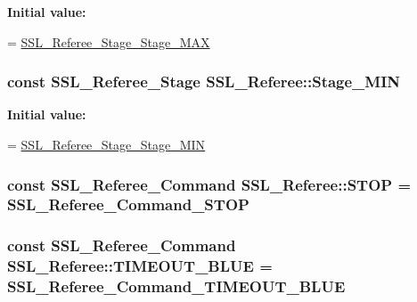 {\bfseries Initial value\-:}
\begin{DoxyCode}
=
    \hyperlink{referee_8pb_8h_a889bcc451ec1e5d5c903210b3ae883fa}{SSL\_Referee\_Stage\_Stage\_MAX}
\end{DoxyCode}
\hypertarget{class_s_s_l___referee_a846b2fccc0f85f19185e811d3552280c}{
\subsubsection[{Stage\-\_\-\-M\-I\-N}]{\setlength{\rightskip}{0pt plus 5cm}const {\bf S\-S\-L\-\_\-\-Referee\-\_\-\-Stage} S\-S\-L\-\_\-\-Referee\-::\-Stage\-\_\-\-M\-I\-N\hspace{0.3cm}{\ttfamily [static]}}}\label{class_s_s_l___referee_a846b2fccc0f85f19185e811d3552280c}
{\bfseries Initial value\-:}
\begin{DoxyCode}
=
    \hyperlink{referee_8pb_8h_aa1dd5e1b73b65e4bd2e0faa6227acd52}{SSL\_Referee\_Stage\_Stage\_MIN}
\end{DoxyCode}
\hypertarget{class_s_s_l___referee_abf541b386a39f54b87622cd8ebafd77f}{
\subsubsection[{S\-T\-O\-P}]{\setlength{\rightskip}{0pt plus 5cm}const {\bf S\-S\-L\-\_\-\-Referee\-\_\-\-Command} S\-S\-L\-\_\-\-Referee\-::\-S\-T\-O\-P = {\bf S\-S\-L\-\_\-\-Referee\-\_\-\-Command\-\_\-\-S\-T\-O\-P}\hspace{0.3cm}{\ttfamily [static]}}}\label{class_s_s_l___referee_abf541b386a39f54b87622cd8ebafd77f}
\hypertarget{class_s_s_l___referee_a7a9e39e940a4538aec3e0a8b8f96199f}{
\subsubsection[{T\-I\-M\-E\-O\-U\-T\-\_\-\-B\-L\-U\-E}]{\setlength{\rightskip}{0pt plus 5cm}const {\bf S\-S\-L\-\_\-\-Referee\-\_\-\-Command} S\-S\-L\-\_\-\-Referee\-::\-T\-I\-M\-E\-O\-U\-T\-\_\-\-B\-L\-U\-E = {\bf S\-S\-L\-\_\-\-Referee\-\_\-\-Command\-\_\-\-T\-I\-M\-E\-O\-U\-T\-\_\-\-B\-L\-U\-E}\hspace{0.3cm}{\ttfamily [static]}}}\label{class_s_s_l___referee_a7a9e39e940a4538aec3e0a8b8f96199f}
